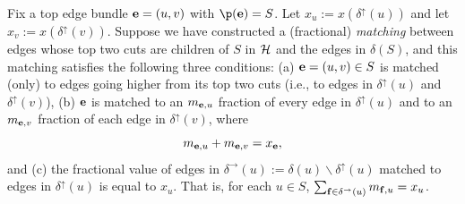 \begin{example} \label{ex:simple}
Fix a top edge bundle ${\bf e} = (u,v)$ with $\p(\bbe) = S$.
Let $x_u := x(\delta^\uparrow (u))$ and let $x_v := x(\delta^\uparrow (v))$. Suppose we have constructed a (fractional) {\em matching} between edges whose top two cuts are children of $S$ in $\mathcal{H}$ and the edges in $\delta(S)$, and this matching satisfies the following three conditions: (a) ${\bf e}=(u,v)\in S$ is matched (only) to edges going higher from its top two cuts (i.e., to edges in $\delta^\uparrow (u)$ and $\delta^\uparrow (v)$),  (b) ${\bf e}$ is matched to  
an $m_{{\bf e},u}$ fraction of every edge in $\delta^\uparrow(u)$ and to an $m_{{\bf e},v}$ fraction of each edge in $\delta^\uparrow(v)$, where
$$m_{{\bf e},u}  + m_{{\bf e}, v}  = x_{\bf e},$$ and (c) the fractional value of edges in $\delta^\rightarrow(u):= \delta(u) \smallsetminus \delta^\uparrow(u)$ matched to edges in $\delta^\uparrow(u)$  is equal to $x_u$. That is, for each $u\in S$, $\sum_{{\bf f} \in \delta^\rightarrow(u)} m_{{\bf f},u} = x_u$.

\begin{figure}[htb]
\centering	
{}
\end{figure}



\end{example}
